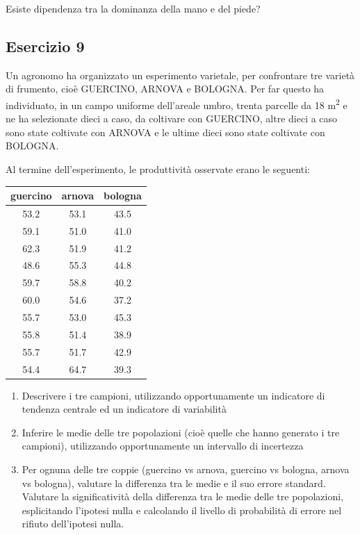\documentclass[a4paper,12pt,oneside]{book}
\providecommand{\tightlist}{%
  \setlength{\itemsep}{0pt}\setlength{\parskip}{0pt}}
\begin{document}
Esiste dipendenza tra la dominanza della mano e del piede?

\hypertarget{esercizio-9-1}{%
\subsection{Esercizio 9}\label{esercizio-9-1}}

Un agronomo ha organizzato un esperimento varietale, per confrontare tre varietà di frumento, cioè GUERCINO, ARNOVA e BOLOGNA. Per far questo ha individuato, in un campo uniforme dell'areale umbro, trenta parcelle da 18 m\textsuperscript{2} e ne ha selezionate dieci a caso, da coltivare con GUERCINO, altre dieci a caso sono state coltivate con ARNOVA e le ultime dieci sono state coltivate con BOLOGNA.

Al termine dell'esperimento, le produttività osservate erano le seguenti:

\begin{tabular}{c|c|c}
\hline
guercino & arnova & bologna\\
\hline
53.2 & 53.1 & 43.5\\
\hline
59.1 & 51.0 & 41.0\\
\hline
62.3 & 51.9 & 41.2\\
\hline
48.6 & 55.3 & 44.8\\
\hline
59.7 & 58.8 & 40.2\\
\hline
60.0 & 54.6 & 37.2\\
\hline
55.7 & 53.0 & 45.3\\
\hline
55.8 & 51.4 & 38.9\\
\hline
55.7 & 51.7 & 42.9\\
\hline
54.4 & 64.7 & 39.3\\
\hline
\end{tabular}

\begin{enumerate}
\def\labelenumi{\arabic{enumi}.}
\tightlist
\item
  Descrivere i tre campioni, utilizzando opportunamente un indicatore di tendenza centrale ed un indicatore di variabilità
\item
  Inferire le medie delle tre popolazioni (cioè quelle che hanno generato i tre campioni), utilizzando opportunamente un intervallo di incertezza
\item
  Per ognuna delle tre coppie (guercino vs arnova, guercino vs bologna, arnova vs bologna), valutare la differenza tra le medie e il suo errore standard. Valutare la significatività della differenza tra le medie delle tre popolazioni, esplicitando l'ipotesi nulla e calcolando il livello di probabilità di errore nel rifiuto dell'ipotesi nulla.
\end{enumerate}
\end{document}
